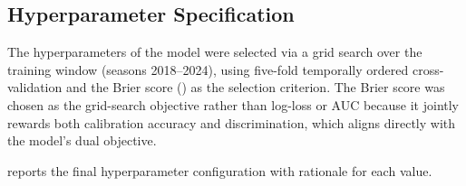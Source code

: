 \subsection{Hyperparameter Specification}
\label{sec:hyperparams}

The hyperparameters of the \xscore{} model were selected via a grid search over
the training window (seasons 2018--2024), using five-fold temporally ordered
cross-validation and the Brier score () as the selection
criterion. The Brier score was chosen as the grid-search objective rather than
log-loss or AUC because it jointly rewards both calibration accuracy and
discrimination, which aligns directly with the model's dual objective.

 reports the final hyperparameter configuration with
rationale for each value.

